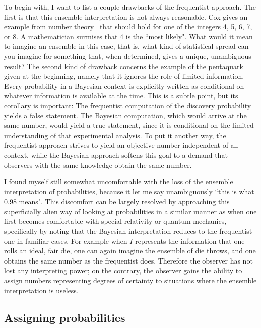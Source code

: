 To begin with, I want to list a couple drawbacks of the frequentist approach.
The first is that this ensemble interpretation is not always reasonable. Cox
gives an example from number theory~\cite{cox_probability_1946} that should hold
for one of the integers 4, 5, 6, 7, or 8. A mathematician surmises that
4 is the ``most likely". What would it mean to imagine an ensemble in this case,
that is, what kind of statistical spread can you imagine for something that,
when determined, gives a unique, unambiguous result?
The second kind of drawback concerns the example of the pentaquark given at the
beginning, namely that it ignores the role of limited information. Every
probability in a Bayesian context is explicitly written as conditional on
whatever information is available at the time. This is a subtle point, but its
corollary is important: The frequentist computation of the discovery probability 
yields a false statement. The Bayesian computation, which would arrive at the same 
number, would yield a true statement, since it is conditional on the limited
understanding of that experimental analysis. To put it another way, the
frequentist approach strives to yield an objective number independent of all
context, while the Bayesian approach softens this goal to a demand that
observers with the same knowledge obtain the same number.

I found myself still somewhat uncomfortable with the loss of the ensemble
interpretation of probabilities, because it let me say unambiguously ``this is
what 0.98 means". This discomfort can be largely resolved by approaching this
superficially alien way of looking at probabilities in a similar manner as when
one first becomes comfortable with special relativity or quantum mechanics,
specifically by noting that the Bayesian interpretation reduces to the
frequentist one in familiar cases. For example when $I$ represents the
information that one rolls an ideal, fair die, one can again imagine the
ensemble of die throws, and one obtains the same number as the frequentist does.
Therefore the observer has not lost any interpreting power; on the contrary, the 
observer gains the ability to assign numbers representing degrees of certainty to
situations where the ensemble interpretation is useless.


\subsection{Assigning probabilities}\label{sec:informationEntropy}


